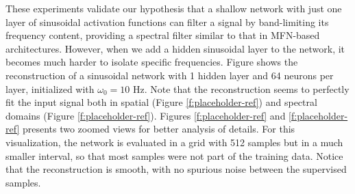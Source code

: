 These experiments validate our hypothesis that a shallow network with just one layer of sinusoidal activation functions can filter a signal by band-limiting its frequency content, providing a spectral filter similar to that in MFN-based architectures. However, when we add a hidden sinusoidal layer to the network, it becomes much harder to isolate specific frequencies. Figure shows the reconstruction of a sinusoidal network with 1 hidden layer and 64 neurons per layer, initialized with $\omega_0=10$ Hz. Note that the reconstruction seems to perfectly fit the input signal both in spatial (Figure \ref{f:placeholder-ref}) and spectral domains (Figure \ref{f:placeholder-ref}). Figures \ref{f:placeholder-ref} and \ref{f:placeholder-ref} presents two zoomed views for better analysis of details. For this visualization, the network is evaluated in a grid with 512 samples but in a much smaller interval, so that most samples were not part of the training data. Notice that the reconstruction is smooth, with no spurious noise between the supervised samples.


